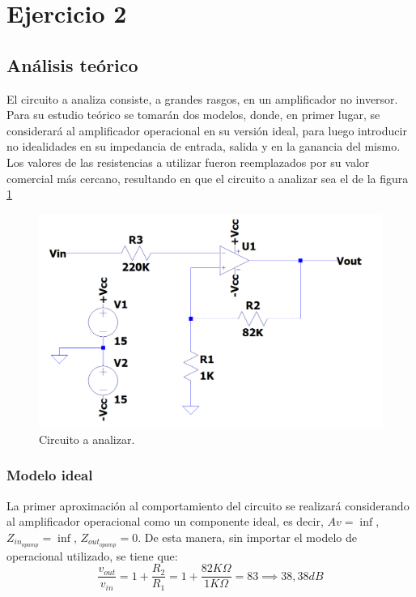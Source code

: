 
\section*{Ejercicio 2}
\subsection{Análisis teórico}
El circuito a analiza consiste, a grandes rasgos, en un amplificador no inversor.
Para su estudio teórico se tomarán dos modelos, donde, en primer lugar, se considerará al amplificador operacional en su versión ideal, para luego introducir no idealidades en su impedancia de entrada, salida y en la ganancia del mismo.
Los valores de las resistencias a utilizar fueron reemplazados por su valor comercial más cercano, resultando en que el circuito a analizar sea el de la figura \ref{fig: Initial circuit}
\begin{figure}[H]
    \begin{minipage}{\textwidth}
        \centering
        \includegraphics[width=\textwidth]{../EJ2/recursos_para_el_informe/circuito_a_analizar}
        \caption{Circuito a analizar.}
        \label{fig: Initial circuit}
    \end{minipage}\hfill
\end{figure}


\subsubsection{Modelo ideal}
La primer aproximación al comportamiento del circuito se realizará considerando al amplificador operacional como un componente ideal, es decir, $Av = \inf$, $Z_{in_{opamp}} = \inf$, $Z_{out_{opamp}} = 0$.
De esta manera, sin importar el modelo de operacional utilizado, se tiene que:
\begin{equation}
    \label{eq: Ideal Gain}
    \frac{v_{out}}{v_{in}} = 1 + \frac{R_2}{R_1} = 1 + \frac{82 K\Omega}{1 K\Omega} = 83 \implies 38,38 dB
\end{equation}

